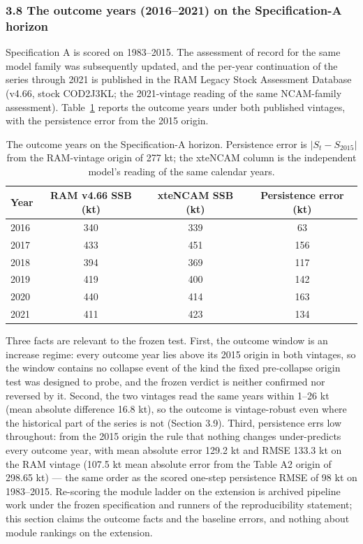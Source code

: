\documentclass[11pt]{article}
\begin{document}
\subsubsection{3.8 The outcome years (2016--2021) on the Specification-A horizon}\label{cod-outcome-years}

Specification A is scored on 1983--2015. The assessment of record for the
same model family was subsequently updated, and the per-year continuation
of the series through 2021 is published in the RAM Legacy Stock Assessment
Database (v4.66, stock COD2J3KL; the 2021-vintage reading of the same
NCAM-family assessment). Table~\ref{cod-tab:outcome} reports the outcome years
under both published vintages, with the persistence error from the 2015
origin.

\begin{table}[h]
\centering
\small
\begin{tabular}{@{}lccc@{}}
\toprule
Year & RAM v4.66 SSB (kt) & xteNCAM SSB (kt) & Persistence error (kt) \\
\midrule
2016 & 340 & 339 & 63 \\
2017 & 433 & 451 & 156 \\
2018 & 394 & 369 & 117 \\
2019 & 419 & 400 & 142 \\
2020 & 440 & 414 & 163 \\
2021 & 411 & 423 & 134 \\
\bottomrule
\end{tabular}
\caption{The outcome years on the Specification-A horizon. Persistence
error is $|S_t - S_{2015}|$ from the RAM-vintage origin of 277 kt; the
xteNCAM column is the independent model's reading of the same calendar
years.}
\label{cod-tab:outcome}
\end{table}

Three facts are relevant to the frozen test. First, the outcome window is
an increase regime: every outcome year lies above its 2015 origin in both
vintages, so the window contains no collapse event of the kind the fixed
pre-collapse origin test was designed to probe, and the frozen verdict is
neither confirmed nor reversed by it. Second, the two vintages read the
same years within 1--26 kt (mean absolute difference 16.8 kt), so the
outcome is vintage-robust even where the historical part of the series is
not (Section 3.9). Third, persistence errs low throughout: from the 2015
origin the rule that nothing changes under-predicts every outcome year,
with mean absolute error 129.2 kt and RMSE 133.3 kt on the RAM vintage
(107.5 kt mean absolute error from the Table A2 origin of 298.65 kt) ---
the same order as the scored one-step persistence RMSE of 98 kt on
1983--2015. Re-scoring the module ladder on the extension is archived
pipeline work under the frozen specification and runners of the
reproducibility statement; this section claims the outcome facts and the
baseline errors, and nothing about module rankings on the extension.
\end{document}
